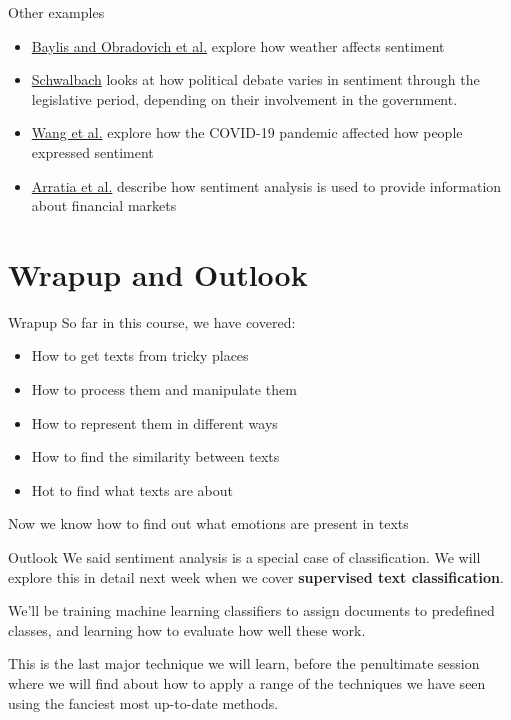 \documentclass[
  10pt,
  ignorenonframetext,
  aspectratio=169]{beamer}
\providecommand{\tightlist}{%
  \setlength{\itemsep}{0pt}\setlength{\parskip}{0pt}}
\begin{document}
\begin{frame}{Other examples}
\protect\hypertarget{other-examples}{}
\begin{itemize}
\tightlist
\item
  \href{https://journals.plos.org/plosone/article?id=10.1371/journal.pone.0195750}{Baylis
  and Obradovich et al.} explore how weather affects sentiment
\item
  \href{https://www.cambridge.org/core/journals/european-political-science-review/article/abs/going-in-circles-the-influence-of-the-electoral-cycle-on-the-party-behaviour-in-parliament/B4693B1A27049DB3BCE314F32D6BD1EB}{Schwalbach}
  looks at how political debate varies in sentiment through the
  legislative period, depending on their involvement in the government.
\item
  \href{https://www.nature.com/articles/s41562-022-01312-y}{Wang et al.}
  explore how the COVID-19 pandemic affected how people expressed
  sentiment
\item
  \href{https://link.springer.com/chapter/10.1007/978-3-030-66891-4_9}{Arratia
  et al.} describe how sentiment analysis is used to provide information
  about financial markets
\end{itemize}
\end{frame}

\hypertarget{wrapup-and-outlook}{%
\section{Wrapup and Outlook}\label{wrapup-and-outlook}}

\begin{frame}{Wrapup}
\protect\hypertarget{wrapup}{}
So far in this course, we have covered:

\begin{itemize}
\tightlist
\item
  How to get texts from tricky places
\item
  How to process them and manipulate them
\item
  How to represent them in different ways
\item
  How to find the similarity between texts
\item
  Hot to find what texts are about
\end{itemize}

Now we know how to find out what emotions are present in texts
\end{frame}

\begin{frame}{Outlook}
\protect\hypertarget{outlook}{}
We said sentiment analysis is a special case of classification. We will
explore this in detail next week when we cover \textbf{supervised text
classification}.

We'll be training machine learning classifiers to assign documents to
predefined classes, and learning how to evaluate how well these work.

This is the last major technique we will learn, before the penultimate
session where we will find about how to apply a range of the techniques
we have seen using the fanciest most up-to-date methods.
\end{frame}
\end{document}
